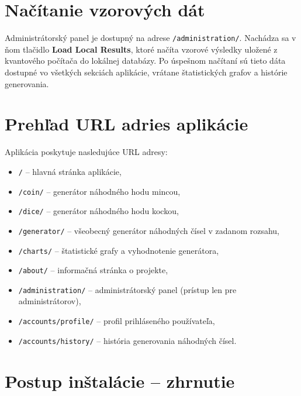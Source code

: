 \section{Načítanie vzorových dát}\label{sec:load.data}

Administrátorský panel je dostupný na adrese \texttt{/administration/}.
Nachádza sa v ňom tlačidlo \textbf{Load Local Results}, ktoré načíta
vzorové výsledky uložené z kvantového počítača do lokálnej databázy.
Po úspešnom načítaní sú tieto dáta dostupné vo všetkých sekciách
aplikácie, vrátane štatistických grafov a histórie generovania.


\section{Prehľad URL adries aplikácie}\label{sec:url.overview}

Aplikácia poskytuje nasledujúce URL adresy:

\begin{itemize}
  \item \texttt{/} -- hlavná stránka aplikácie,
  \item \texttt{/coin/} -- generátor náhodného hodu mincou,
  \item \texttt{/dice/} -- generátor náhodného hodu kockou,
  \item \texttt{/generator/} -- všeobecný generátor náhodných čísel
  v zadanom rozsahu,
  \item \texttt{/charts/} -- štatistické grafy a vyhodnotenie generátora,
  \item \texttt{/about/} -- informačná stránka o projekte,
  \item \texttt{/administration/} -- administrátorský panel
  (prístup len pre administrátorov),
  \item \texttt{/accounts/profile/} -- profil prihláseného používateľa,
  \item \texttt{/accounts/history/} -- história generovania náhodných čísel.
\end{itemize}

\section{Postup inštalácie -- zhrnutie}\label{sec:install.summary}

